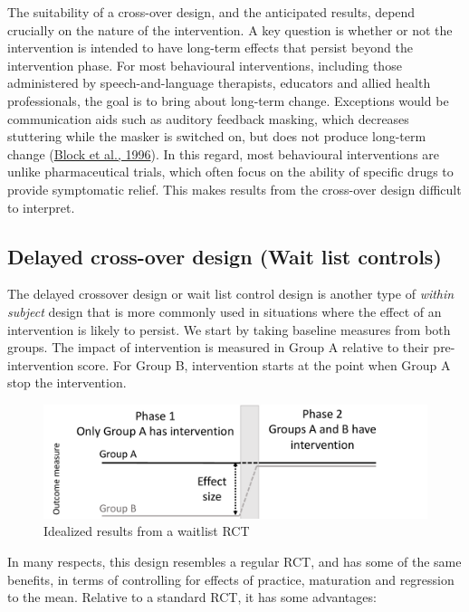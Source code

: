 \documentclass{krantz}
\begin{document}
The suitability of a cross-over design, and the anticipated results, depend crucially on the nature of the intervention. A key question is whether or not the intervention is intended to have long-term effects that persist beyond the intervention phase. For most behavioural interventions, including those administered by speech-and-language therapists, educators and allied health professionals, the goal is to bring about long-term change. Exceptions would be communication aids such as auditory feedback masking, which decreases stuttering while the masker is switched on, but does not produce long-term change (\protect\hyperlink{ref-block1996}{Block et al., 1996}). In this regard, most behavioural interventions are unlike pharmaceutical trials, which often focus on the ability of specific drugs to provide symptomatic relief. This makes results from the cross-over design difficult to interpret.

\hypertarget{delayed-crossover-design-wait-list-controls}{%
\subsection{Delayed cross-over design (Wait list controls)}\label{delayed-crossover-design-wait-list-controls}}

The delayed crossover design or wait list control design is another type of \emph{within subject} design that is more commonly used in situations where the effect of an intervention is likely to persist. We start by taking baseline measures from both groups. The impact of intervention is measured in Group A relative to their pre-intervention score. For Group B, intervention starts at the point when Group A stop the intervention.

\begin{figure}
\includegraphics[width=0.75\linewidth]{images_bw/waitlist} \caption{Idealized results from a waitlist RCT}\label{fig:waitlist-plot}
\end{figure}

In many respects, this design resembles a regular RCT, and has some of the same benefits, in terms of controlling for effects of practice, maturation and regression to the mean. Relative to a standard RCT, it has some advantages:
\end{document}

